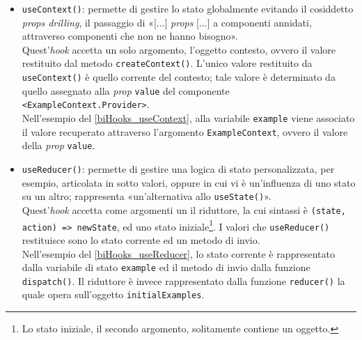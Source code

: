 \begin{itemize}
  
  
  \item {\texttt{useContext()}}: permette di gestire lo stato globalmente evitando il cosiddetto \textit{props drilling}, il passaggio di «[...] \textit{props} [...] a componenti annidati, attraverso componenti che non ne hanno bisogno»\cite{FreeCodeCamp_ReactContextBeginners}.\\
  Quest'\textit{hook} accetta un solo argomento, l'oggetto contesto, ovvero il valore restituito dal metodo \texttt{createContext()}. L'unico valore restituito da \texttt{useContext()} è quello corrente del contesto; tale valore è determinato da quello assegnato alla \textit{prop} \texttt{value} del componente \texttt{<ExampleContext.Provider>}.\\ 
  Nell'esempio del \autoref{biHooks_useContext}, alla variabile \texttt{example} viene associato il valore recuperato attraverso l'argomento \texttt{ExampleContext}, ovvero il valore della \textit{prop} \texttt{value}.

  

  \item {\texttt{useReducer()}}: permette di gestire una logica di stato personalizzata, per esempio, articolata in sotto valori, oppure in cui vi è un'influenza di uno stato su un altro; rappresenta «un'alternativa allo \texttt{useState()}»\cite{React_APIriferimentoHooks_useReducer}.\\
  Quest'\textit{hook} accetta come argomenti un il riduttore, la cui sintassi è \texttt{(state, action) => newState}, ed uno stato iniziale\footnote{Lo stato iniziale, il secondo argomento, solitamente contiene un oggetto.}. I valori che \texttt{useReducer()} restituisce sono lo stato corrente ed un metodo di invio.\\
  Nell'esempio del \autoref{biHooks_useReducer}, lo stato corrente è rappresentato dalla variabile di stato \texttt{example} ed il metodo di invio dalla funzione \texttt{dispatch()}. Il riduttore è invece rappresentato dalla funzione \texttt{reducer()} la quale opera sull'oggetto \texttt{initialExamples}.
  

\end{itemize}

